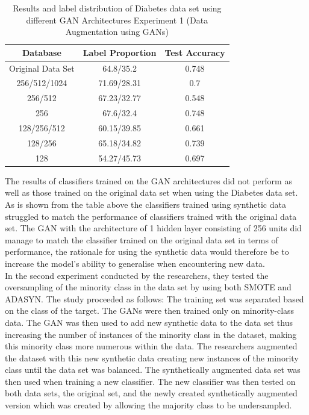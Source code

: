 \begin{table}[H]
    \centering
    \begin{tabular}{|c|c|c|}
    \hline
     Database 
     & Label Proportion
     & Test Accuracy\\
     \hline
         Original Data Set & 64.8/35.2 & 0.748\\
         256/512/1024 & 71.69/28.31 & 0.7\\
         256/512 & 67.23/32.77 & 0.548\\
         256 & 67.6/32.4 & 0.748\\
         128/256/512 & 60.15/39.85 & 0.661\\
         128/256 & 65.18/34.82 & 0.739\\
         128 & 54.27/45.73 & 0.697\\
    \hline
    \end{tabular}
    \caption{Results and label distribution of Diabetes data set using different GAN Architectures Experiment 1 (Data Augmentation using GANs)\cite{litReviewGanDataAugmentation}}
    \label{tab:Results and label distribution of Diabetes Dataset using different GAN Architectures (Data Augmentation using GANs)}
\end{table}
The results of classifiers trained on the GAN architectures did not perform as well as those trained on the original data set when using the Diabetes data set.  As is shown from the table above the classifiers trained using synthetic data struggled to match the performance of classifiers trained with the original data set.  The GAN with the architecture of 1 hidden layer consisting of 256 units did manage to match the classifier trained on the original data set in terms of performance, the rationale for using the synthetic data would therefore be to increase the model's ability to generalise when encountering new data.
\\
In the second experiment conducted by the researchers, they tested the oversampling of the minority class in the data set by using both SMOTE and ADASYN.  The study proceeded as follows: The training set was separated based on the class of the target. The GANs were then trained only on minority-class data.  The GAN was then used to add new synthetic data to the data set thus increasing the number of instances of the minority class in the dataset, making this minority class more numerous within the data.  The researchers augmented the dataset with this new synthetic data creating new instances of the minority class until the data set was balanced. The synthetically augmented data set was then used when training a new classifier. The new classifier was then tested on both data sets, the original set, and the newly created synthetically augmented version which was created by allowing the majority class to be undersampled.
